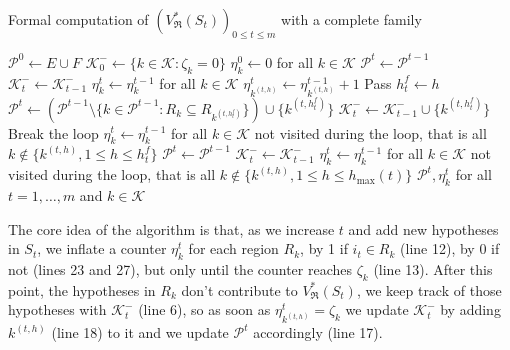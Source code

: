 \documentclass[
  11pt,
  a4paper,
]{article}
\theoremstyle{plain}
\theoremstyle{definition}
\theoremstyle{plain}
\theoremstyle{definition}
\theoremstyle{plain}
\theoremstyle{remark}
\begin{document}
\begin{algorithm}[htb!]
\caption{Formal computation of $(V^*_{\mathfrak{R}}(S_t))_{0\leq t\leq m}$ with a complete family}
\label{alg-formal-curve}
\begin{algorithmic}[1]
  \State $\mathcal{P}^0\gets E\cup F$  
  \State $\mathcal{K}^-_0\gets\{k\in\mathcal{K} : \zeta_k=0  \}$
  \State $\eta^0_k\gets0$ for all $k\in\mathcal{K}$
      \State $\mathcal{P}^t \gets \mathcal{P}^{t-1}$
      \State $\mathcal{K}^-_t \gets \mathcal{K}^-_{t-1}$
      \State $\eta^t_k\gets\eta^{t-1}_k$ for all $k\in\mathcal{K}$
    \Else
        \State $\eta^t_{k^{(t,h)}}\gets\eta^{t-1}_{k^{(t,h)}} + 1$
          \State Pass
        \Else
          \State $h^f_t \gets h$ 
          \State $\mathcal{P}^t \gets\left( \mathcal{P}^{t-1}\setminus \{ k\in \mathcal{P}^{t-1} : R_k\subseteq R_{k^{(t,h^f_t)}} \}\right)\cup \{ k^{(t,h^f_t)} \}$
          \State $\mathcal{K}^-_t \gets \mathcal{K}^-_{t-1} \cup \{k^{(t,h^f_t)}\}$
          \State Break the loop
        \EndIf
      \EndFor
        \State $\eta^t_k\gets\eta^{t-1}_k$ for all $k\in\mathcal{K}$ not visited during the loop, that is all $k\not\in\{k^{(t,h)}, 1\leq h\leq h^f_t   \}$
      \Else
        \State $\mathcal{P}^t \gets \mathcal{P}^{t-1}$
        \State $\mathcal{K}^-_t \gets \mathcal{K}^-_{t-1}$
        \State $\eta^t_k\gets\eta^{t-1}_k$ for all $k\in\mathcal{K}$ not visited during the loop, that is all $k\not\in\{k^{(t,h)}, 1\leq h\leq h_{\max}(t)   \}$
      \EndIf
    \EndIf
  \EndFor
  \State\Return $\mathcal{P}^t, \eta^t_k$ for all $t=1,\dotsc, m$ and $k\in\mathcal{K}$
\EndProcedure
\end{algorithmic}
\end{algorithm}

The core idea of the algorithm is that, as we increase \(t\) and add new
hypotheses in \(S_t\), we inflate a counter \(\eta_k^t\) for each region
\(R_k\), by 1 if \(i_t\in R_k\) (line 12), by 0 if not (lines 23 and
27), but only until the counter reaches \(\zeta_k\) (line 13). After
this point, the hypotheses in \(R_k\) don't contribute to
\(V^*_{\mathfrak{R}}(S_t)\), we keep track of those hypotheses with
\(\mathcal{K}^-_t\) (line 6), so as soon as
\(\eta^t_{k^{(t,h)}}=\zeta_k\) we update \(\mathcal{K}^-_t\) by adding
\(k^{(t,h)}\) (line 18) to it and we update \(\mathcal{P}^t\)
accordingly (line 17).
\end{document}
